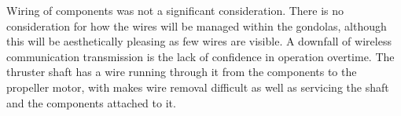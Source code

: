 \documentclass[../main.tex]{subfiles}
\begin{document}
Wiring of components was not a significant consideration. There is no consideration for how the wires will be managed within the gondolas, although this will be aesthetically pleasing as few wires are visible. A downfall of wireless communication transmission is the lack of confidence in operation overtime. The thruster shaft has a wire running through it from the components to the propeller motor, with makes wire removal difficult as well as servicing the shaft and the components attached to it.\\
\end{document}
